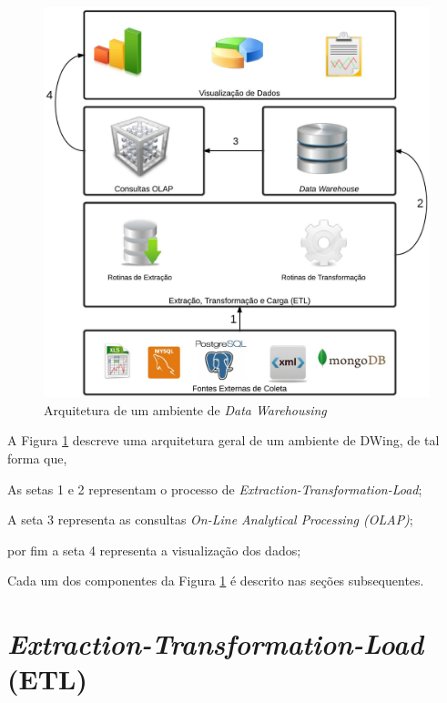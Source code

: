 \begin{figure}[h!]
\centering
	\includegraphics[keepaspectratio=true,scale=0.20]{figuras/Dwing.eps}
	\caption{Arquitetura de um ambiente de \textit{Data Warehousing}}
	\label{dwing}
\end{figure}
\FloatBarrier



A Figura \ref{dwing} descreve uma arquitetura geral de um ambiente de DWing, de tal forma que,

\begin{inparaenum}[i)]
	\item As setas 1 e 2 representam o processo de \textit{Extraction-Transformation-Load};
	
	\item A seta 3 representa as consultas \textit{On-Line Analytical Processing (OLAP)};
	
	\item por fim a seta 4 representa a visualização dos dados;

\end{inparaenum}
 
 	Cada um dos componentes da Figura \ref{dwing} é descrito nas seções subsequentes.



\section{\textit{Extraction-Transformation-Load} (ETL)}

